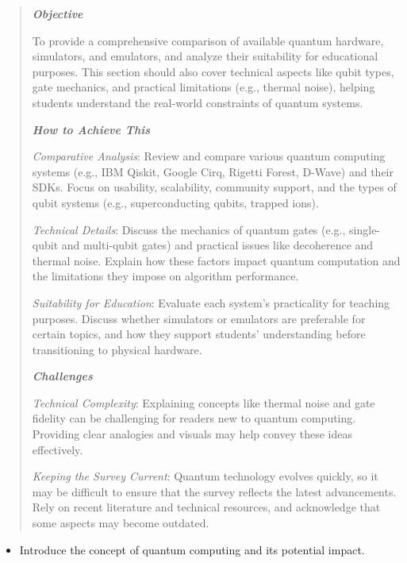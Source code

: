 \begin{quote}\itshape
\textbf{\emph{Objective}}

To provide a comprehensive comparison of available quantum hardware, simulators, and emulators, and analyze their suitability for educational purposes. This section should also cover technical aspects like qubit types, gate mechanics, and practical limitations (e.g., thermal noise), helping students understand the real-world constraints of quantum systems.

\textbf{\emph{How to Achieve This}}

\emph{Comparative Analysis}: Review and compare various quantum computing systems (e.g., IBM Qiskit, Google Cirq, Rigetti Forest, D-Wave) and their SDKs. Focus on usability, scalability, community support, and the types of qubit systems (e.g., superconducting qubits, trapped ions).
      
\emph{Technical Details}: Discuss the mechanics of quantum gates (e.g., single-qubit and multi-qubit gates) and practical issues like decoherence and thermal noise. Explain how these factors impact quantum computation and the limitations they impose on algorithm performance.
    
\emph{Suitability for Education}: Evaluate each system’s practicality for teaching purposes. Discuss whether simulators or emulators are preferable for certain topics, and how they support students’ understanding before transitioning to physical hardware.

\textbf{\emph{Challenges}}

\emph{Technical Complexity}: Explaining concepts like thermal noise and gate fidelity can be challenging for readers new to quantum computing. Providing clear analogies and visuals may help convey these ideas effectively.
    
\emph{Keeping the Survey Current}: Quantum technology evolves quickly, so it may be difficult to ensure that the survey reflects the latest advancements. Rely on recent literature and technical resources, and acknowledge that some aspects may become outdated.
\end{quote}\ignorespacesafterend
    
\begin{itemize}
    \item Introduce the concept of quantum computing and its potential impact.
\end{itemize}

